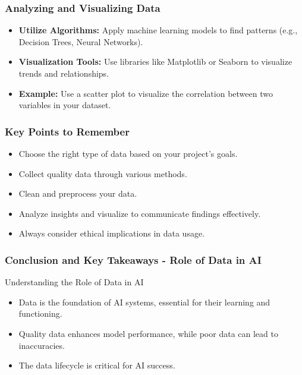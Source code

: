 \documentclass[aspectratio=169]{beamer}
\begin{document}
\begin{frame}
    \frametitle{Analyzing and Visualizing Data}
    \begin{itemize}
        \item \textbf{Utilize Algorithms:} Apply machine learning models to find patterns (e.g., Decision Trees, Neural Networks).
        \item \textbf{Visualization Tools:} Use libraries like Matplotlib or Seaborn to visualize trends and relationships.
        \item \textbf{Example:} Use a scatter plot to visualize the correlation between two variables in your dataset.
    \end{itemize}
\end{frame}

\begin{frame}
    \frametitle{Key Points to Remember}
    \begin{itemize}
        \item Choose the right type of data based on your project's goals.
        \item Collect quality data through various methods.
        \item Clean and preprocess your data.
        \item Analyze insights and visualize to communicate findings effectively.
        \item Always consider ethical implications in data usage.
    \end{itemize}
\end{frame}

\begin{frame}[fragile]
    \frametitle{Conclusion and Key Takeaways - Role of Data in AI}
    \begin{block}{Understanding the Role of Data in AI}
        \begin{itemize}
            \item Data is the foundation of AI systems, essential for their learning and functioning.
            \item Quality data enhances model performance, while poor data can lead to inaccuracies.
            \item The data lifecycle is critical for AI success.
        \end{itemize}
    \end{block}
\end{frame}
\end{document}
